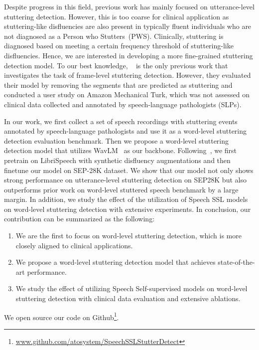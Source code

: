 Despite progress in this field, previous work has mainly focused on utterance-level stuttering detection.
However, this is too coarse for clinical application as stuttering-like disfluencies are also present in typically fluent individuals who are not diagnosed as a Person who Stutters~(PWS).
Clinically, stuttering is diagnosed based on meeting a certain frequency threshold of stuttering-like disfluencies.  
Hence, we are interested in developing a more fine-grained stuttering detection model.
To our best knowledge, ~\cite{harvill22_interspeech} is the only previous work that investigates the task of frame-level stuttering detection.
However, they evaluated their model by removing the segments that are predicted as stuttering and conducted a user study on Amazon Mechanical Turk, which was not assessed on clinical data collected and annotated by speech-language pathologists (SLPs).

In our work, we first collect a set of speech recordings with stuttering events annotated by speech-language pathologists and use it as a word-level stuttering detection evaluation benchmark.
Then we propose a word-level stuttering detection model that utilizes WavLM~\cite{Chen2021WavLMLS} as our backbone.
Following~\cite{harvill22_interspeech}, we first pretrain on LibriSpeech with synthetic disfluency augmentations and then finetune our model on SEP-28K dataset.
We show that our model not only shows strong performance on utterance-level stuttering detection on SEP28K but also outperforms prior work on word-level stuttered speech benchmark by a large margin.
In addition, we study the effect of the utilization of Speech SSL models on word-level stuttering detection with extensive experiments.
In conclusion, our contribution can be summarized as the following:
\begin{enumerate}
    \item We are the first to focus on word-level stuttering detection, which is more closely aligned to clinical applications.
    \item We propose a word-level stuttering detection model that achieves state-of-the-art performance.
    \item We study the effect of utilizing Speech Self-supervised models on word-level stuttering detection with clinical data evaluation and extensive ablations.
\end{enumerate}
We open source our code on Github\footnote{\url{www.github.com/atosystem/SpeechSSLStutterDetect}}.
